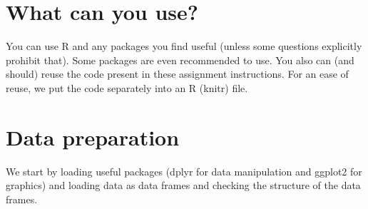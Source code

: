 \documentclass{article}\usepackage[]{graphicx}\usepackage[]{color}
\begin{document}
\section{What can you use?}

You can use R and any packages you find useful (unless some questions explicitly prohibit that). Some packages are even recommended to use. You also can (and should) reuse the code present in these assignment instructions. For an ease of reuse, we put the code separately into an R (knitr) file.

\section{Data preparation}

We start by loading useful packages (dplyr for data manipulation and ggplot2 for graphics) and loading data as data frames and checking the structure of the data frames.
\end{document}
